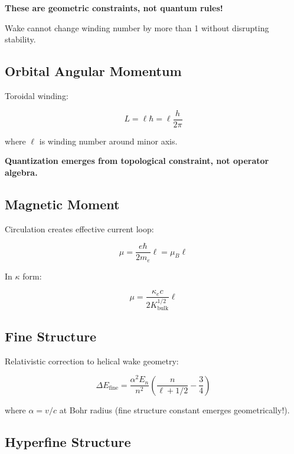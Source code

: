 \textbf{These are geometric constraints, not quantum rules!}

Wake cannot change winding number by more than 1 without disrupting stability.

\subsection{Orbital Angular Momentum}

Toroidal winding:

\begin{equation}
L = \ell \hbar = \ell \frac{h}{2\pi}
\end{equation}

where $\ell$ is winding number around minor axis.

\textbf{Quantization emerges from topological constraint, not operator algebra.}

\subsection{Magnetic Moment}

Circulation creates effective current loop:

\begin{equation}
\mu = \frac{e \hbar}{2m_e} \ell = \mu_B \ell
\end{equation}

In $\kappa$ form:

\begin{equation}
\mu = \frac{\kappa_e c}{2K_{\text{bulk}}^{1/2}} \ell
\end{equation}

\subsection{Fine Structure}

Relativistic correction to helical wake geometry:

\begin{equation}
\Delta E_{\text{fine}} = \frac{\alpha^2 E_n}{n^2} \left(\frac{n}{\ell + 1/2} - \frac{3}{4}\right)
\end{equation}

where $\alpha = v/c$ at Bohr radius (fine structure constant emerges geometrically!).

\subsection{Hyperfine Structure}

